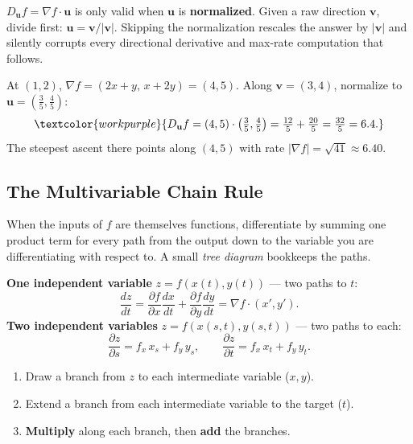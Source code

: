 \begin{warningbox}
$D_{\mathbf u}f=\nabla f\cdot\mathbf u$ is only valid when $\mathbf u$ is
\textbf{normalized}. Given a raw direction $\mathbf v$, divide first:
$\mathbf u=\mathbf v/\lvert\mathbf v\rvert$. Skipping the normalization rescales
the answer by $\lvert\mathbf v\rvert$ and silently corrupts every directional
derivative and max-rate computation that follows.
\end{warningbox}

\begin{examplebox}[Worked Example 6.3: Directional derivative of $f=x^2+xy+y^2$]
At $(1,2)$, $\nabla f=(2x+y,\,x+2y)=(4,5)$. Along $\mathbf v=(3,4)$, normalize to
$\mathbf u=(\tfrac35,\tfrac45)$:
\[ \textcolor{workpurple}{D_{\mathbf u}f = (4,5)\cdot\left(\tfrac35,\tfrac45\right)
   = \tfrac{12}{5}+\tfrac{20}{5} = \tfrac{32}{5} = 6.4.} \]
The steepest ascent there points along $(4,5)$ with rate
$\lvert\nabla f\rvert=\sqrt{41}\approx 6.40$.
\end{examplebox}

\subsection{The Multivariable Chain Rule}

When the inputs of $f$ are themselves functions, differentiate by summing one
product term for every path from the output down to the variable you are
differentiating with respect to. A small \emph{tree diagram} bookkeeps the paths.

\begin{methodbox}
\textbf{One independent variable} $z=f(x(t),y(t))$ --- two paths to $t$:
\[ \frac{dz}{dt} = \frac{\partial f}{\partial x}\frac{dx}{dt}
                 + \frac{\partial f}{\partial y}\frac{dy}{dt}
                 = \nabla f \cdot (x',y'). \]
\textbf{Two independent variables} $z=f(x(s,t),y(s,t))$ --- two paths to each:
\[ \frac{\partial z}{\partial s} = f_x\,x_s + f_y\,y_s,
   \qquad
   \frac{\partial z}{\partial t} = f_x\,x_t + f_y\,y_t. \]
\begin{enumerate}[leftmargin=1.6em, itemsep=2pt]
    \item Draw a branch from $z$ to each intermediate variable ($x,y$).
    \item Extend a branch from each intermediate variable to the target ($t$).
    \item \textbf{Multiply} along each branch, then \textbf{add} the branches.
\end{enumerate}
\end{methodbox}

